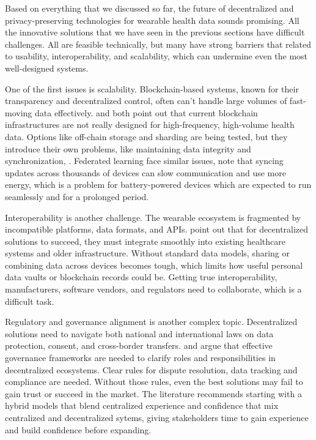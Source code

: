 	Based on everything that we discussed so far, the future of decentralized and privacy-preserving technologies for wearable health data sounds promising. All the innovative solutions that we have seen in the previous sections have difficult challenges. All are feasible technically, but many have strong barriers that related to usability, interoperability, and scalability, which can undermine even the most well-designed systems.

	One of the first issues is scalability. Blockchain-based systems, known for their transparency and decentralized control, often can't handle large volumes of fast-moving data effectively. \cite{Mun2010} and \cite{Boonsong2024} both point out that current blockchain infrastructures are not really designed for high-frequency, high-volume health data. Options like off-chain storage and sharding are being tested, but they introduce their own problems, like maintaining data integrity and synchronization, \cite{Zhou2023}. Federated learning face similar issues, \cite{Xu2021} note that syncing updates across thousands of devices can slow communication and use more energy, which is a problem for battery-powered devices which are expected to run seamlessly and for a prolonged period.

	Interoperability is another challenge. The wearable ecosystem is fragmented by incompatible platforms, data formats, and APIs. \cite{Papadopoulou2015} point out that for decentralized solutions to succeed, they must integrate smoothly into existing healthcare systems and older infrastructure. Without standard data models, sharing or combining data across devices becomes tough, which limits how useful personal data vaults or blockchain records could be. Getting true interoperability, manufacturers, software vendors, and regulators need to collaborate, which is a difficult task.

	Regulatory and governance alignment is another complex topic. Decentralized solutions need to navigate both national and international laws on data protection, consent, and cross-border transfers. \cite{Papadopoulou2015} and \cite{Abraham2019} argue that effective governance frameworks are needed to clarify roles and responsibilities in decentralized ecosystems. Clear rules for dispute resolution, data tracking and compliance are needed. Without those rules, even the best solutions may fail to gain trust or succeed in the market. The literature recommends starting with a hybrid models that blend centralized experience and confidence that mix centralized and decentralized sytems, giving stakeholders time to gain experience and build confidence before expanding.

